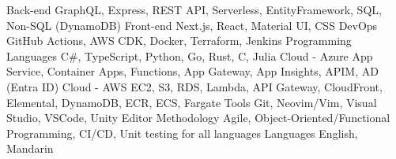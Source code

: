 \begin{cvskills}
  \cvskill
    {Back-end} %
    {GraphQL, Express, REST API, Serverless, EntityFramework, SQL, Non-SQL (DynamoDB)} %
  \cvskill
    {Front-end} %
    {Next.js, React, Material UI, CSS} %
  \cvskill
    {DevOps} %
    {GitHub Actions, AWS CDK, Docker, Terraform, Jenkins} %
  \cvskill
    {Programming Languages} %
    {C\#, TypeScript, Python, Go, Rust, C, Julia} %
  \cvskill
    {Cloud - Azure} %
    {App Service, Container Apps, Functions, App Gateway, App Insights, APIM, AD (Entra ID)} %
  \cvskill
    {Cloud - AWS} %
    {EC2, S3, RDS, Lambda, API Gateway, CloudFront, Elemental, DynamoDB, ECR, ECS, Fargate} %
  \cvskill
    {Tools} %
    {Git, Neovim/Vim, Visual Studio, VSCode, Unity Editor} %
  \cvskill
    {Methodology} %
    {Agile, Object-Oriented/Functional Programming, CI/CD, Unit testing for all languages} %
  \cvskill
    {Languages} %
    {English, Mandarin} %
\end{cvskills}

